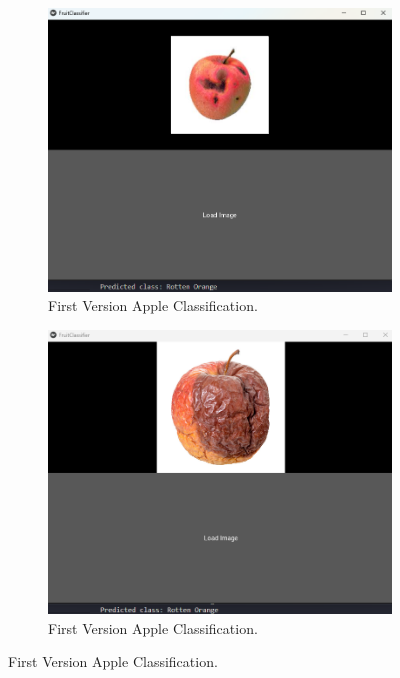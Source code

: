 \documentclass[conference]{IEEEtran}
\begin{document}
\begin{figure}[h]
    \centering
    \begin{subfigure}[b]{0.48\linewidth}
        \centering
        \includegraphics[width=\linewidth]{1layer appelR1.png}
        \caption{First Version Apple Classification.}
        \label{figFA}
    \end{subfigure}
    \hfill
    \begin{subfigure}[b]{0.48\linewidth}
        \centering
        \includegraphics[width=\linewidth]{1layer appelR2.png}
        \caption{First Version Apple Classification.}

\end{subfigure}
\end{figure}
\end{document}

